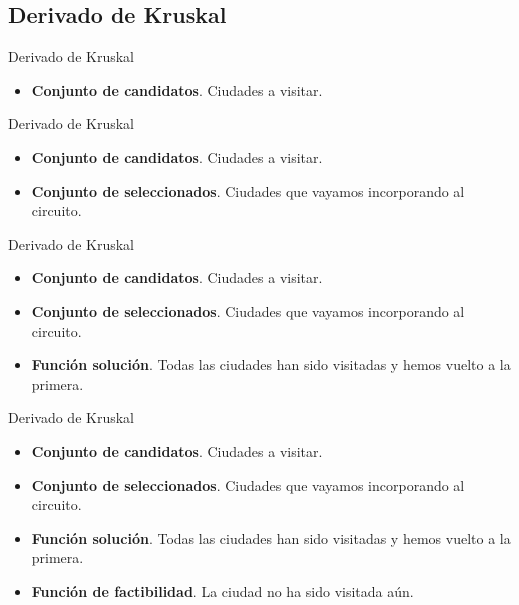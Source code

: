 \documentclass{beamer}
\begin{document}
\subsection{Derivado de Kruskal}



\begin{frame}[fragile]{Derivado de Kruskal}

\begin{itemize}
	\item \textbf{Conjunto de candidatos}. Ciudades a visitar.
\end{itemize}

\end{frame}

\begin{frame}[fragile]{Derivado de Kruskal}

\begin{itemize}
	\item \textbf{Conjunto de candidatos}. Ciudades a visitar.
	\item \textbf{Conjunto de seleccionados}. Ciudades que vayamos incorporando al circuito.
\end{itemize}

\end{frame}

\begin{frame}[fragile]{Derivado de Kruskal}

\begin{itemize}
	\item \textbf{Conjunto de candidatos}. Ciudades a visitar.
	\item \textbf{Conjunto de seleccionados}. Ciudades que vayamos incorporando al circuito.
	\item \textbf{Función solución}. Todas las ciudades han sido visitadas y hemos vuelto a la primera.
\end{itemize}

\end{frame}

\begin{frame}[fragile]{Derivado de Kruskal}

\begin{itemize}
	\item \textbf{Conjunto de candidatos}. Ciudades a visitar.
	\item \textbf{Conjunto de seleccionados}. Ciudades que vayamos incorporando al circuito.
	\item \textbf{Función solución}. Todas las ciudades han sido visitadas y hemos vuelto a la primera.
	\item \textbf{Función de factibilidad}. La ciudad no ha sido visitada aún.
\end{itemize}

\end{frame}
\end{document}
